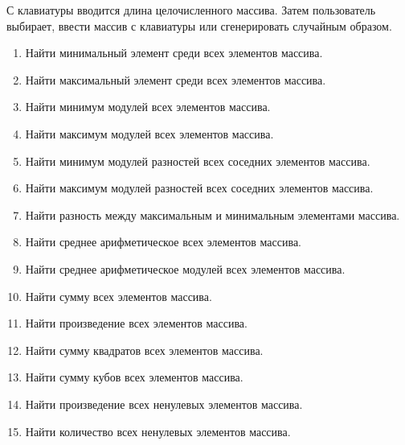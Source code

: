 
\labtask

С клавиатуры вводится длина целочисленного массива.
Затем пользователь выбирает, ввести массив с клавиатуры или сгенерировать случайным образом.

\begin{enumerate}

	\item Найти минимальный элемент среди всех элементов массива.

	\item Найти максимальный элемент среди всех элементов массива.

	\item Найти минимум модулей всех элементов массива.

	\item Найти максимум модулей всех элементов массива.

	\item Найти минимум модулей разностей всех соседних элементов массива.

	\item  Найти максимум модулей разностей всех соседних элементов массива.

	\item Найти разность между максимальным и минимальным элементами массива.

	\item Найти среднее арифметическое всех элементов массива.

	\item Найти среднее арифметическое модулей всех элементов массива.

	\item Найти сумму всех элементов массива.

	\item Найти произведение всех элементов массива.

	\item Найти сумму квадратов всех элементов массива.

	\item Найти сумму кубов всех элементов массива.

	\item Найти произведение всех ненулевых элементов массива.

	\item Найти количество всех ненулевых элементов массива.

\end{enumerate}


